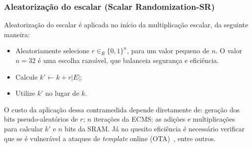 \documentclass{SBCbookchapter}
\newcommand{\rcv}{\leftarrow}
\begin{document}

\subsubsection{Aleatorização do escalar (Scalar Randomization-SR)}
Aleatorização do escalar é aplicada no início da multiplicação escalar, da seguinte maneira:
\begin{itemize}
    \item Aleatoriamente selecione $r\in_R \{0,1\}^n$, para um valor  pequeno de $n$. O valor $n=32$ é uma escolha razoável, que balanceia   segurança e eficiência.
    \item Calcule $k' \rcv k + r |E|$;
    \item Utilize $k'$ no lugar de $k$.
\end{itemize}

O custo da aplicação dessa contramedida depende diretamente de: geração dos bits pseudo-aleatórios de $r$; $n$ iterações da ECMS; as adições e multiplicações para calcular $k'$ e $n$ bits da SRAM. Já no quesito eficiência é necessário verificar que se é vulnerável a ataques de \emph{template} online (OTA)~\cite{BatinaChmielewski2014}, entre outros. 

\end{document}
